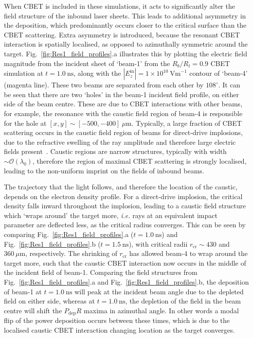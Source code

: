 When \ac{CBET} is included in these simulations, it acts to significantly alter the field structure of the inbound laser sheets.
This leads to additional asymmetry in the deposition, which predominantly occurs closer to the critical surface than the \ac{CBET} scattering.
Extra asymmetry is introduced, because the resonant \ac{CBET} interaction is spatially localised, as opposed to azimuthally symmetric around the target.
Fig.~\ref{fig:Res1_field_profiles}.a illustrates this by plotting the electric field magnitude from the incident sheet of `beam-1' from the $R_b/R_t=0.9$ \ac{CBET} simulation at $t=1.0\ \text{ns}$, along with the $|E_z^{\text{in}}|=1\times10^{10}\ \text{Vm}^{-1}$ contour of `beam-4' (magenta line).
These two beams are separated from each other by $108^{\circ}$.
It can be seen that there are two `holes' in the beam-1 incident field profile, on either side of the beam centre.
These are due to \ac{CBET} interactions with other beams, for example, the resonance with the caustic field region of beam-4 is responsible for the hole at $[x,y]\sim[-500,-400]\ \mu\text{m}$.
Typically, a large fraction of \ac{CBET} scattering occurs in the caustic field region of beams for direct-drive implosions, due to the refractive swelling of the ray amplitude and therefore large electric fields present~\cite{colaitis_adaptive_2019}.
Caustic regions are narrow structures, typically with width $\sim\mathcal{O}(\lambda_0)$, therefore the region of maximal \ac{CBET} scattering is strongly localised, leading to the non-uniform imprint on the fields of inbound beams.

The trajectory that the light follows, and therefore the location of the caustic, depends on the electron density profile.
For a direct-drive implosion, the critical density falls inward throughout the implosion, leading to a caustic field structure which `wraps around' the target more, \textit{i.e.} rays at an equivalent impact parameter are deflected less, as the critical radius converges.
This can be seen by comparing Fig.~\ref{fig:Res1_field_profiles}.a ($t=1.0\ \text{ns}$) and Fig.~\ref{fig:Res1_field_profiles}.b ($t=1.5\ \text{ns}$), with critical radii $r_{\text{cr}}\sim430$ and $360\ \mu\text{m}$, respectively.
The shrinking of $r_{\text{cr}}$ has allowed beam-4 to wrap around the target more, such that the caustic \ac{CBET} interaction now occurs in the middle of the incident field of beam-1.
Comparing the field structures from Fig.~\ref{fig:Res1_field_profiles}.a and Fig.~\ref{fig:Res1_field_profiles}.b, the deposition of beam-1 at $t=1.0\ \text{ns}$ will peak at the incident beam angle due to the depleted field on either side, whereas at $t=1.0\ \text{ns}$, the depletion of the field in the beam centre will shift the $P_{\text{dep}}R$ maxima in azimuthal angle.
In other words a modal flip of the power deposition occurs between these times, which is due to the localised caustic \ac{CBET} interaction changing location as the target converges.

